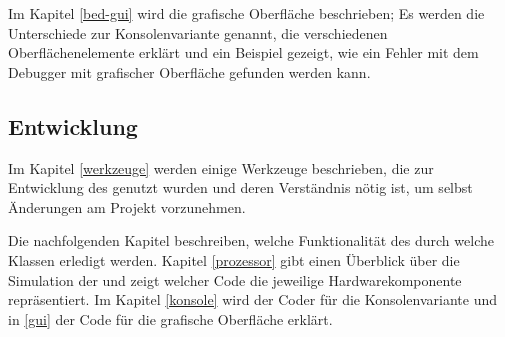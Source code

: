 Im Kapitel \ref{bed-gui} wird die grafische Oberfläche beschrieben; Es werden die Unterschiede zur Konsolenvariante genannt, die verschiedenen Oberflächenelemente erklärt und ein Beispiel gezeigt, wie ein Fehler mit dem Debugger mit grafischer Oberfläche gefunden werden kann.

\subsection*{Entwicklung}
Im Kapitel \ref{werkzeuge} werden einige Werkzeuge beschrieben, die zur Entwicklung des \md{} genutzt wurden und deren Verständnis nötig ist, um selbst Änderungen am Projekt vorzunehmen.

Die nachfolgenden Kapitel beschreiben, welche Funktionalität des \md{} durch welche Klassen erledigt werden. Kapitel \ref{prozessor} gibt einen Überblick über die Simulation der \mic{} und zeigt welcher Code die jeweilige Hardwarekomponente repräsentiert. Im Kapitel \ref{konsole} wird der Coder für die Konsolenvariante und in \ref{gui} der Code für die grafische Oberfläche erklärt.